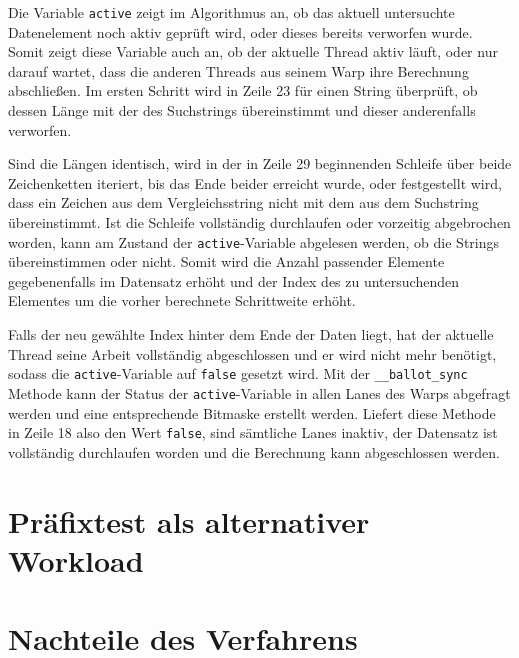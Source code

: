 Die Variable \texttt{active} zeigt im Algorithmus an, ob das aktuell untersuchte Datenelement noch aktiv geprüft wird, oder dieses bereits verworfen wurde.
Somit zeigt diese Variable auch an, ob der aktuelle Thread aktiv läuft, oder nur darauf wartet, dass die anderen Threads aus seinem Warp ihre Berechnung abschließen.
Im ersten Schritt wird in Zeile 23 für einen String überprüft, ob dessen Länge mit der des Suchstrings übereinstimmt und dieser anderenfalls verworfen.

Sind die Längen identisch, wird in der in Zeile 29 beginnenden Schleife über beide Zeichenketten iteriert, bis das Ende beider erreicht wurde, oder festgestellt wird, dass ein Zeichen aus dem Vergleichsstring nicht mit dem aus dem Suchstring übereinstimmt. %
Ist die Schleife vollständig durchlaufen oder vorzeitig abgebrochen worden, kann am Zustand der \texttt{active}-Variable abgelesen werden, ob die Strings übereinstimmen oder nicht.
Somit wird die Anzahl passender Elemente gegebenenfalls im Datensatz erhöht und der Index des zu untersuchenden Elementes um die vorher berechnete Schrittweite erhöht.

Falls der neu gewählte Index hinter dem Ende der Daten liegt, hat der aktuelle Thread seine Arbeit vollständig abgeschlossen und er wird nicht mehr benötigt, sodass die \texttt{active}-Variable auf \texttt{false} gesetzt wird.
Mit der \texttt{\_\_ballot\_sync} Methode kann der Status der \texttt{active}-Variable in allen Lanes des Warps abgefragt werden und eine entsprechende Bitmaske erstellt werden.
Liefert diese Methode in Zeile 18 also den Wert \texttt{false}, sind sämtliche Lanes inaktiv, der Datensatz ist vollständig durchlaufen worden und die Berechnung kann abgeschlossen werden.


\section{Präfixtest als alternativer Workload}

\section{Nachteile des Verfahrens}